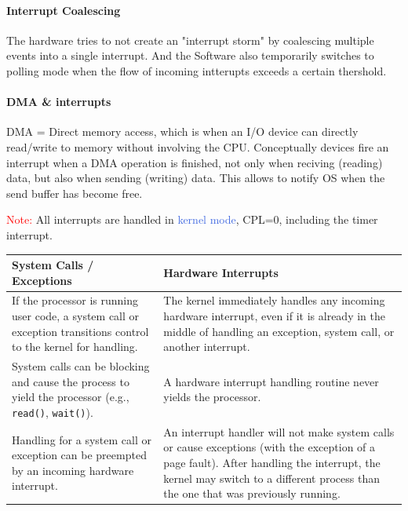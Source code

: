 \documentclass[openany,12pt]{book}
\newcommand{\red}[1]{\textcolor{Red}{#1}}
\newcommand{\blue}[1]{\textcolor{RoyalBlue}{#1}}
\begin{document}
\paragraph{Interrupt Coalescing} The hardware tries to not create an "interrupt storm" by coalescing multiple events into a single interrupt. And the Software also temporarily switches to polling mode when the flow of incoming intterupts exceeds a certain thershold.

\paragraph{DMA \& interrupts} DMA = Direct memory access, which is when an I/O device can directly read/write to memory without involving the CPU. Conceptually devices fire an interrupt when a DMA operation is finished, not only when reciving (reading) data, but also when sending (writing) data. This allows to notify OS when the send buffer has become free.


\red{Note:} All interrupts are handled in \blue{kernel mode}, CPL=0, including the timer interrupt.




\begin{samepage}
  \begin{center}
  \begin{tabular}{|>{\raggedright\arraybackslash}p{6.5cm}|
  >{\raggedright\arraybackslash}p{6.5cm}|}
  \hline
  \rowcolor{blue!30}
  \textbf{System Calls / Exceptions} & \textbf{Hardware Interrupts} \\
  \hline
  If the processor is running user code, a system call or exception transitions control to the kernel for handling.
  &
  The kernel immediately handles any incoming hardware interrupt, even if it is already in the middle of handling an exception, system call, or another interrupt.
  \\
  \hline
  System calls can be blocking and cause the process to yield the processor (e.g., \texttt{read()}, \texttt{wait()}).
  &
  A hardware interrupt handling routine never yields the processor.
  \\
  \hline
  Handling for a system call or exception can be preempted by an incoming hardware interrupt.
  &
  An interrupt handler will not make system calls or cause exceptions (with the exception of a page fault). After handling the interrupt, the kernel may switch to a different process than the one that was previously running.
  \\
  \hline
  \end{tabular}
  \end{center}
 \end{samepage}
\end{document}
